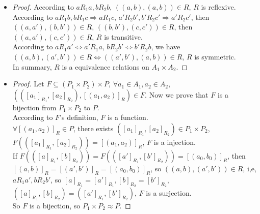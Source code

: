 \documentclass{article}
\begin{document}
\begin{itemize}
    \item
    \begin{proof}
        According to $aR_1a, bR_2b$, $((a, b), (a, b)) \in R$, $R$ is reflexive. \\
        According to $aR_1b, bR_1c \Rightarrow aR_1c$, $a'R_2b', b'R_2c' \Rightarrow a'R_2c'$, then $((a, a'), (b, b')) \in R$, $((b, b'), (c, c')) \in R$, then $((a, a'), (c, c')) \in R$, $R$ is transitive. \\
        According to $aR_1a' \Leftrightarrow a'R_1a$, $bR_2b' \Leftrightarrow b'R_2b$, we have $((a, b), (a', b')) \in R \Leftrightarrow ((a', b'), (a, b)) \in R$, $R$ is symmetric. \\
        In summary, $R$ is a equivalence relations on $A_1 \times A_2$.
    \end{proof} 
    \item 
    \begin{proof}
        Let $F \subseteq (P_1 \times P_2) \times P$, $\forall a_1 \in A_1, a_2 \in A_2$, $\left(([a_1]_{R_1}, [a_2]_{R_2}), [(a_1, a_2)]_R\right) \in F$. Now we prove that $F$ is a bijection from $P_1 \times P_2$ to $P$. \\
        According to $F$'s definition, $F$ is a function. \\
        $\forall [(a_1, a_2)]_R \in P$, there exists $([a_1]_{R_1}, [a_2]_{R_2}) \in P_1 \times P_2$, $F(([a_1]_{R_1}, [a_2]_{R_2})) = [(a_1, a_2)]_R$, $F$ is a injection. \\
        If $F(([a]_{R_1}, [b]_{R_2})) = F(([a']_{R_1}, [b']_{R_2})) = [(a_0, b_0)]_R$, then $[(a, b)]_R = [(a', b')]_R = [(a_0, b_0)]_R$, so $((a, b), (a', b')) \in R$, i,e, $aR_1a', bR_2b'$, so $[a]_{R_1} = [a']_{R_1}, [b]_{R_2} = [b']_{R_2}$, $([a]_{R_1}, [b]_{R_2}) = ([a']_{R_1}, [b']_{R_2})$, $F$ is a surjection. \\
        So $F$ is a bijection, so $P_1 \times P_2 \approx P$.
    \end{proof}
\end{itemize}
\end{document}
